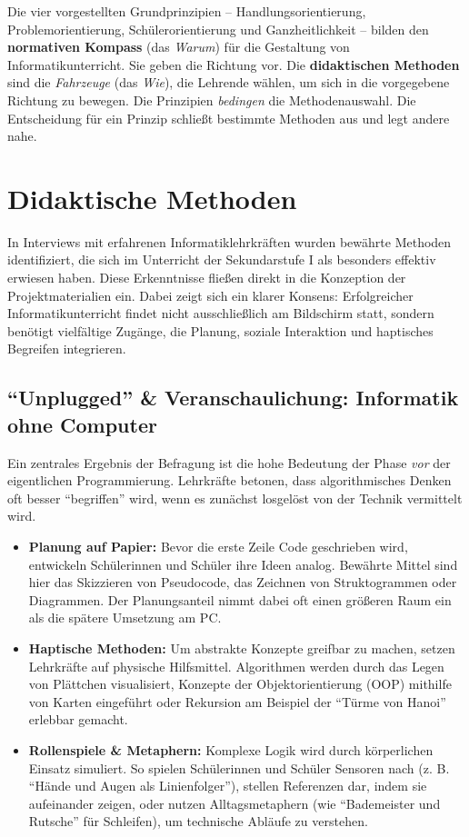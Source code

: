 \documentclass[a5paper,pagesize,10pt,bibtotoc,pointlessnumbers,
normalheadings,DIV=9,twoside=false]{scrbook}
\begin{document}
Die vier vorgestellten Grundprinzipien -- Handlungsorientierung, Problemorientierung, Schülerorientierung und Ganzheitlichkeit -- bilden den \textbf{normativen Kompass} (das \textit{Warum}) für die Gestaltung von Informatikunterricht. Sie geben die Richtung vor. Die \textbf{didaktischen Methoden} sind die \textit{Fahrzeuge} (das \textit{Wie}), die Lehrende wählen, um sich in die vorgegebene Richtung zu bewegen. Die Prinzipien \textit{bedingen} die Methodenauswahl. Die Entscheidung für ein Prinzip schließt bestimmte Methoden aus und legt andere nahe.

\section*{Didaktische Methoden}

In Interviews mit erfahrenen Informatiklehrkräften wurden bewährte Methoden identifiziert, die sich im Unterricht der Sekundarstufe I als besonders effektiv erwiesen haben. Diese Erkenntnisse fließen direkt in die Konzeption der Projektmaterialien ein. Dabei zeigt sich ein klarer Konsens: Erfolgreicher Informatikunterricht findet nicht ausschließlich am Bildschirm statt, sondern benötigt vielfältige Zugänge, die Planung, soziale Interaktion und haptisches Begreifen integrieren.

\subsection*{``Unplugged'' \& Veranschaulichung: Informatik ohne Computer}

Ein zentrales Ergebnis der Befragung ist die hohe Bedeutung der Phase \textit{vor} der eigentlichen Programmierung. Lehrkräfte betonen, dass algorithmisches Denken oft besser ``begriffen'' wird, wenn es zunächst losgelöst von der Technik vermittelt wird.

\begin{itemize}
    \item \textbf{Planung auf Papier:} Bevor die erste Zeile Code geschrieben wird, entwickeln Schülerinnen und Schüler ihre Ideen analog. Bewährte Mittel sind hier das Skizzieren von Pseudocode, das Zeichnen von Struktogrammen oder Diagrammen. Der Planungsanteil nimmt dabei oft einen größeren Raum ein als die spätere Umsetzung am PC.
    \item \textbf{Haptische Methoden:} Um abstrakte Konzepte greifbar zu machen, setzen Lehrkräfte auf physische Hilfsmittel. Algorithmen werden durch das Legen von Plättchen visualisiert, Konzepte der Objektorientierung (OOP) mithilfe von Karten eingeführt oder Rekursion am Beispiel der ``Türme von Hanoi'' erlebbar gemacht.
    \item \textbf{Rollenspiele \& Metaphern:} Komplexe Logik wird durch körperlichen Einsatz simuliert. So spielen Schülerinnen und Schüler Sensoren nach (z. B. ``Hände und Augen als Linienfolger''), stellen Referenzen dar, indem sie aufeinander zeigen, oder nutzen Alltagsmetaphern (wie ``Bademeister und Rutsche'' für Schleifen), um technische Abläufe zu verstehen.
\end{itemize}
\end{document}

